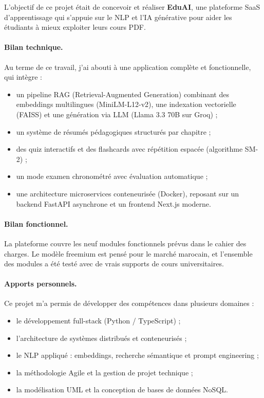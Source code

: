 
L'objectif de ce projet était de concevoir et réaliser \textbf{EduAI}, une plateforme SaaS d'apprentissage qui s'appuie sur le NLP et l'IA générative pour aider les étudiants à mieux exploiter leurs cours PDF.

\paragraph{Bilan technique.}
Au terme de ce travail, j'ai abouti à une application complète et fonctionnelle, qui intègre :
\begin{itemize}
  \item un pipeline RAG (Retrieval-Augmented Generation) combinant des embeddings multilingues (MiniLM-L12-v2), une indexation vectorielle (FAISS) et une génération via LLM (Llama 3.3 70B sur Groq) ;
  \item un système de résumés pédagogiques structurés par chapitre ;
  \item des quiz interactifs et des flashcards avec répétition espacée (algorithme SM-2) ;
  \item un mode examen chronométré avec évaluation automatique ;
  \item une architecture microservices conteneurisée (Docker), reposant sur un backend FastAPI asynchrone et un frontend Next.js moderne.
\end{itemize}

\paragraph{Bilan fonctionnel.}
La plateforme couvre les neuf modules fonctionnels prévus dans le cahier des charges. Le modèle freemium est pensé pour le marché marocain, et l'ensemble des modules a été testé avec de vrais supports de cours universitaires.

\paragraph{Apports personnels.}
Ce projet m'a permis de développer des compétences dans plusieurs domaines :
\begin{itemize}
  \item le développement full-stack (Python / TypeScript) ;
  \item l'architecture de systèmes distribués et conteneurisés ;
  \item le NLP appliqué : embeddings, recherche sémantique et prompt engineering ;
  \item la méthodologie Agile et la gestion de projet technique ;
  \item la modélisation UML et la conception de bases de données NoSQL.
\end{itemize}

